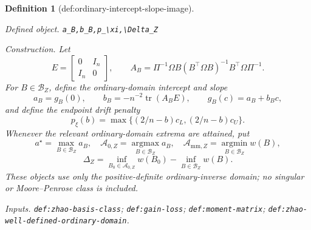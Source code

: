 \documentclass{article}
\newtheorem{definition}{Definition}
\begin{document}
\begin{definition}[def:ordinary-intercept-slope-image]\label{def:ordinary-intercept-slope-image}
\par\smallskip\noindent\emph{Defined object.} \texttt{a\_\allowbreak{}B,\allowbreak{}b\_\allowbreak{}B,\allowbreak{}p\_\allowbreak{}\textbackslash{}\allowbreak{}xi,\allowbreak{}\textbackslash{}\allowbreak{}Delta\_\allowbreak{}Z}
\par\smallskip\noindent\emph{Construction.} Let
\[
E=\begin{bmatrix}0&I_n\\I_n&0\end{bmatrix},
\qquad
A_B=\Pi^{-1}\Omega B(B^{\top}\Omega B)^{-1}B^{\top}\Omega\Pi^{-1}.
\]
For \(B\in\mathcal B_Z\), define the ordinary-domain intercept and slope
\[
a_B=g_B(0),
\qquad
b_B=-n^{-2}\operatorname{tr}(A_BE),
\qquad g_B(c)=a_B+b_Bc,
\]
and define the endpoint drift penalty
\[
p_\xi(b)=\max\{(2/n-b)c_L,(2/n-b)c_U\}.
\]
Whenever the relevant ordinary-domain extrema are attained, put
\[
a^\star=\max_{B\in\mathcal B_Z}a_B,
\quad
\mathcal A_{0,Z}=\operatorname*{argmax}_{B\in\mathcal B_Z}a_B,
\quad
\mathcal A_{\mathrm{mm},Z}=\operatorname*{argmin}_{B\in\mathcal B_Z}w(B),
\]
\[
\Delta_Z=
\inf_{B_0\in\mathcal A_{0,Z}}w(B_0)
-\inf_{B\in\mathcal B_Z}w(B).
\]
These objects use only the positive-definite ordinary-inverse domain; no singular or Moore--Penrose class is included.
\par\smallskip\noindent\emph{Inputs.} \texttt{def:\allowbreak{}zhao-\allowbreak{}basis-\allowbreak{}class}; \texttt{def:\allowbreak{}gain-\allowbreak{}loss}; \texttt{def:\allowbreak{}moment-\allowbreak{}matrix}; \texttt{def:\allowbreak{}zhao-\allowbreak{}well-\allowbreak{}defined-\allowbreak{}ordinary-\allowbreak{}domain}.
\end{definition}
\end{document}
